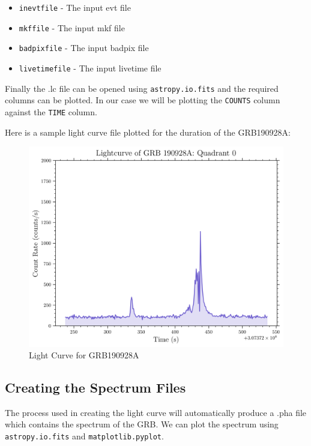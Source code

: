 \documentclass[11pt]{book} %
\begin{document}
\begin{itemize}
    \item \lstinline[language=bash]{inevtfile} - The input evt file
    \item \lstinline[language=bash]{mkffile} - The input mkf file
    \item \lstinline[language=bash]{badpixfile} - The input badpix file
    \item \lstinline[language=bash]{livetimefile} - The input livetime file
\end{itemize}

Finally the .lc file can be opened using \lstinline[language=Python]{astropy.io.fits} and the required columns can be plotted. In our case we will be plotting the \lstinline[language=Python]{COUNTS} column against the \lstinline[language=Python]{TIME} column.

Here is a sample light curve file plotted for the duration of the GRB190928A:

\begin{figure}[H]
    \centering
    \includegraphics[scale=0.65]{Pictures/sample_lc.png}
    \caption{Light Curve for GRB190928A}
\end{figure}

\subsection{Creating the Spectrum Files}

The process used in creating the light curve will automatically produce a .pha file which contains the spectrum of the GRB. We can plot the spectrum using \lstinline[language=Python]{astropy.io.fits} and \lstinline[language=Python]{matplotlib.pyplot}.
\end{document}
